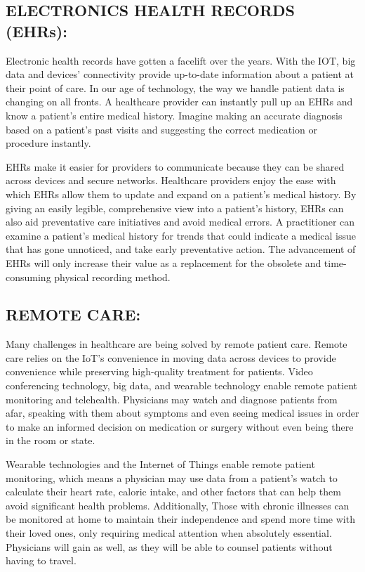 \documentclass[12pt]{article}
\begin{document}
\subsection{ELECTRONICS HEALTH RECORDS (EHRs):}

Electronic health records have gotten a facelift over the years. With the IOT, big data and devices’ connectivity provide up-to-date information about a patient at their point of care. In our age of technology, the way we handle patient data is changing on all fronts. A healthcare provider can instantly pull up an EHRs and know a patient’s entire medical history. Imagine making an accurate diagnosis based on a patient’s past visits and suggesting the correct medication or procedure instantly.

EHRs make it easier for providers to communicate because they can be shared across devices and secure networks. Healthcare providers enjoy the ease with which EHRs allow them to update and expand on a patient's medical history. By giving an easily legible, comprehensive view into a patient's history, EHRs can also aid preventative care initiatives and avoid medical errors. A practitioner can examine a patient's medical history for trends that could indicate a medical issue that has gone unnoticed, and take early preventative action. The advancement of EHRs will only increase their value as a replacement for the obsolete and time-consuming physical recording method.



\subsection{REMOTE CARE:}
Many challenges in healthcare are being solved by remote patient care. Remote care relies on the IoT's convenience in moving data across devices to provide convenience while preserving high-quality treatment for patients. Video conferencing technology, big data, and wearable technology enable remote patient monitoring and telehealth. Physicians may watch and diagnose patients from afar, speaking with them about symptoms and even seeing medical issues in order to make an informed decision on medication or surgery without even being there in the room or state.

Wearable technologies and the Internet of Things enable remote patient monitoring, which means a physician may use data from a patient's watch to calculate their heart rate, caloric intake, and other factors that can help them avoid significant health problems. Additionally, Those with chronic illnesses can be monitored at home to maintain their independence and spend more time with their loved ones, only requiring medical attention when absolutely essential. Physicians will gain as well, as they will be able to counsel patients without having to travel.
\end{document}
